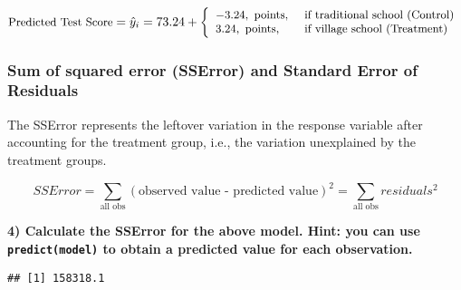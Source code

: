 \documentclass[
]{article}
\newenvironment{Shaded}{\begin{snugshade}}{\end{snugshade}}
\newcommand{\AttributeTok}[1]{\textcolor[rgb]{0.77,0.63,0.00}{#1}}
\newcommand{\DecValTok}[1]{\textcolor[rgb]{0.00,0.00,0.81}{#1}}
\newcommand{\FunctionTok}[1]{\textcolor[rgb]{0.00,0.00,0.00}{#1}}
\newcommand{\NormalTok}[1]{#1}
\newcommand{\OtherTok}[1]{\textcolor[rgb]{0.56,0.35,0.01}{#1}}
\newcommand{\SpecialCharTok}[1]{\textcolor[rgb]{0.00,0.00,0.00}{#1}}
\begin{document}
\[\small{\text{Predicted Test Score}} =  \hat{y}_i = 73.24 + \left\{
\begin{array}{ll}
      -3.24, \text{ points, } &  \text{if traditional school (Control)} \\
      3.24, \text{ points, } &  \text{if village school (Treatment)}
\end{array} 
\right.  \]

\hypertarget{sum-of-squared-error-sserror-and-standard-error-of-residuals}{%
\subsubsection{Sum of squared error (SSError) and Standard Error of
Residuals}\label{sum-of-squared-error-sserror-and-standard-error-of-residuals}}

The SSError represents the leftover variation in the response variable
after accounting for the treatment group, i.e., the variation
unexplained by the treatment groups.

\[SSError = \sum_{\text{all obs}}(\text{observed value - predicted value})^2 = \sum_\text{all obs}residuals^2\]

\textbf{4) Calculate the SSError for the above model. Hint: you can use
\texttt{predict(model)} to obtain a predicted value for each
observation.} \vspace{1in}

\begin{Shaded}
\end{Shaded}

\begin{verbatim}
## [1] 158318.1
\end{verbatim}
\end{document}
